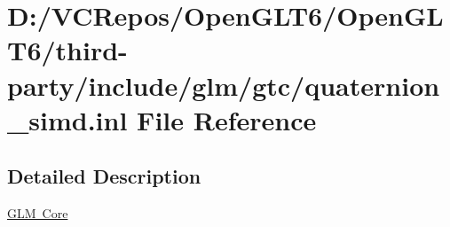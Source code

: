 \hypertarget{quaternion__simd_8inl}{}\section{D\+:/\+V\+C\+Repos/\+Open\+G\+L\+T6/\+Open\+G\+L\+T6/third-\/party/include/glm/gtc/quaternion\+\_\+simd.inl File Reference}
\label{quaternion__simd_8inl}


\subsection{Detailed Description}
\mbox{\hyperlink{group__core}{G\+LM Core}} 